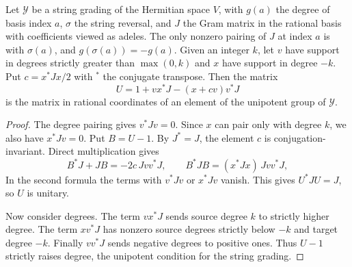 \begin{lemma}
\label{lem:a-bessel-eichler}
\emitthmsource
Let $\mathcal Y$ be a string grading of the Hermitian space $V$, with $g(a)$ the degree of basis index $a$, $\sigma$ the string reversal, and $J$ the Gram matrix in the rational basis with coefficients viewed as adeles. The only nonzero pairing of $J$ at index $a$ is with $\sigma(a)$, and $g(\sigma(a))=-g(a)$. Given an integer $k$, let $v$ have support in degrees strictly greater than $\max(0,k)$ and $x$ have support in degree $-k$. Put $c=x^\ast Jx/2$ with $^\ast$ the conjugate transpose. Then the matrix
\[
 U=1+v x^\ast J-(x+c v)v^\ast J
\]
is the matrix in rational coordinates of an element of the unipotent group of $\mathcal Y$.
\end{lemma}
\begin{proof}
The degree pairing gives $v^\ast Jv=0$. Since $x$ can pair only with degree $k$, we also have $x^\ast Jv=0$. Put $B=U-1$. By $J^\ast=J$, the element $c$ is conjugation-invariant. Direct multiplication gives
\[
 B^\ast J+JB=-2c\,Jv v^\ast J,\qquad
 B^\ast JB=(x^\ast Jx)\,Jv v^\ast J ,
\]
In the second formula the terms with $v^\ast Jv$ or $x^\ast Jv$ vanish. This gives $U^\ast JU=J$, so $U$ is unitary.

Now consider degrees. The term $v x^\ast J$ sends source degree $k$ to strictly higher degree. The term $x v^\ast J$ has nonzero source degrees strictly below $-k$ and target degree $-k$. Finally $v v^\ast J$ sends negative degrees to positive ones. Thus $U-1$ strictly raises degree, the unipotent condition for the string grading.
\end{proof}

